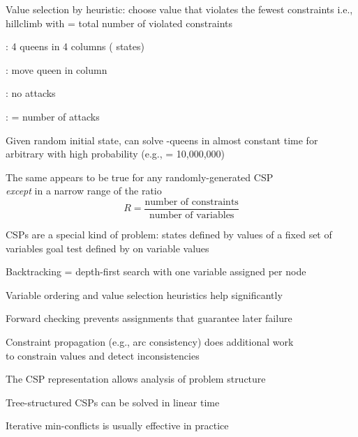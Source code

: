 \documentclass{article}
\begin{document}
\begin{huge}
Value selection by  heuristic:\al
choose value that violates the fewest constraints\al
i.e., hillclimb with  = total number of violated constraints



: 4 queens in 4 columns ( states)

: move queen in column

: no attacks

:  = number of attacks

\vspace*{0.3in}

\textwidth
{}


Given random initial state, can solve -queens in almost constant time for
arbitrary  with high probability (e.g.,  = 10,000,000)

The same appears to be true for any randomly-generated CSP\\
\emph{except} in a narrow range of the ratio
\[
R = \frac{\mbox{number of constraints}}{\mbox{number of variables}}
\]

\vspace*{0.2in}

\textwidth
{}






CSPs are a special kind of problem:\al
states defined by values of a fixed set of variables\al
goal test defined by  on variable values

Backtracking = depth-first search with one variable assigned per node

Variable ordering and value selection heuristics help significantly

Forward checking prevents assignments that guarantee later failure

Constraint propagation (e.g., arc consistency) does additional work\\
to constrain values and detect inconsistencies

The CSP representation allows analysis of problem structure

Tree-structured CSPs can be solved in linear time

Iterative min-conflicts is usually effective in practice







\end{huge}
\end{document}
